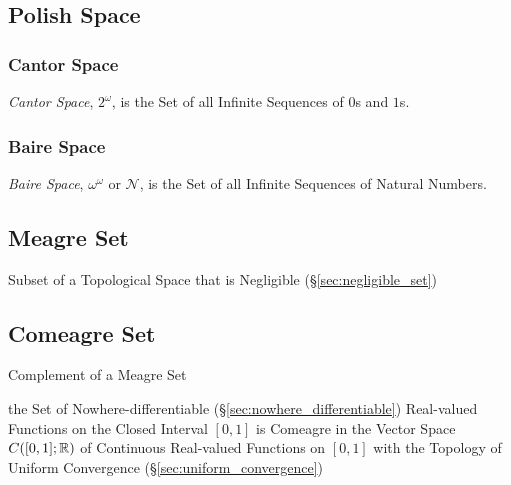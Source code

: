 \subsection{Polish Space}\label{sec:polish_space}

\subsubsection{Cantor Space}\label{sec:cantor_space}

\emph{Cantor Space}, $2^{\omega}$, is the Set of all Infinite
Sequences of $0$s and $1$s.



\subsubsection{Baire Space}\label{sec:baire_space}

\emph{Baire Space}, $\omega^{\omega}$ or $\mathcal{N}$, is the Set of
all Infinite Sequences of Natural Numbers.



\subsection{Meagre Set}\label{sec:meagre_set}

Subset of a Topological Space that is Negligible (\S\ref{sec:negligible_set})



\subsection{Comeagre Set}\label{sec:comeagre_set}

Complement of a Meagre Set

the Set of Nowhere-differentiable (\S\ref{sec:nowhere_differentiable})
Real-valued Functions on the Closed Interval $[0,1]$ is Comeagre in the Vector
Space $C([0,1]; \mathbb{R})$ of Continuous Real-valued Functions on $[0,1]$ with
the Topology of Uniform Convergence (\S\ref{sec:uniform_convergence})




